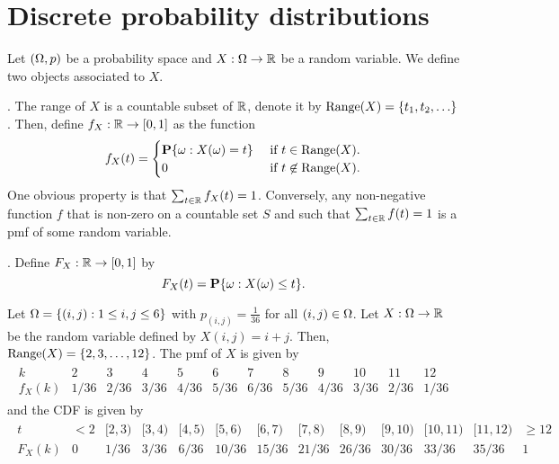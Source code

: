 \documentclass[preprint,  11pt]{amsart}
\begin{document}
\section{Discrete probability distributions}
Let $(\Omega,p)$ be a probability space and $X:\Omega\rightarrow \mathbb{R}$ be a random variable. We define two objects associated to $X$.

. The range of $X$ is a countable subset of $\mathbb{R}$, denote it by $\mbox{Range}(X)=\{t_{1},t_{2},\ldots\}$. Then, define $f_{X}:\mathbb{R}\rightarrow [0,1]$ as the function 
$$
f_{X}(t)=\begin{cases}
\mathbf{P}\{\omega {\; : \;} X(\omega)=t\} & \mbox{ if }t\in \mbox{Range}(X). \\
0 & \mbox{ if }t\not\in \mbox{Range}(X). 
\end{cases}
$$
One obvious property is that $\sum_{t\in \mathbb{R}}f_{X}(t)=1$. Conversely, any non-negative function $f$ that is non-zero on a countable set $S$ and such that $\sum_{t\in \mathbb{R}} f(t)=1$ is a pmf of some random variable.

. Define $F_{X}:\mathbb{R}\rightarrow [0,1]$ by 
$$F_{X}(t)=\mathbf{P}\{\omega{\; : \;} X(\omega)\le t\}.$$

\beg Let $\Omega=\{(i,j){\; : \;} 1\le i,j\le 6\}$ with $p_{(i,j)}=\frac{1}{36}$ for all $(i,j)\in \Omega$. Let $X:\Omega \rightarrow \mathbb{R}$ be the random variable defined by $X(i,j)=i+j$. Then, $\mbox{Range}(X)=\{2,3,\ldots ,12\}$. The pmf  of $X$ is given by
 \small
\begin{align*}
\begin{array}{c||c|c|c|c|c|c|c|c|c|c|c}
k & 2 & 3 & 4 & 5 & 6 & 7 & 8 & 9 & 10 & 11 & 12  \\ \hline
f_X(k) & 1/36 & 2/36 & 3/36 & 4/36 & 5/36 & 6/36 &  5/36 & 4/36 & 3/36 & 2/36 & 1/36
\end{array}
\end{align*}
\normalsize 
and the CDF is given by \small
\begin{align*}
\begin{array}{c||c|c|c|c|c|c|c|c|c|c|c|c|c}
t & <2 & [2,3) & [3,4) & [4,5) & [5,6) & [6,7) & [7,8) & [8,9) & [9,10) & [10,11) & [11,12) & \ge 12  \\ \hline
F_X(k) & 0 &1/36 & 3/36 & 6/36 & 10/36 & 15/36 & 21/36 &  26/36 & 30/36 & 33/36 & 35/36 & 1 
\end{array}
\end{align*}
\normalsize
\eeg
\end{document}
